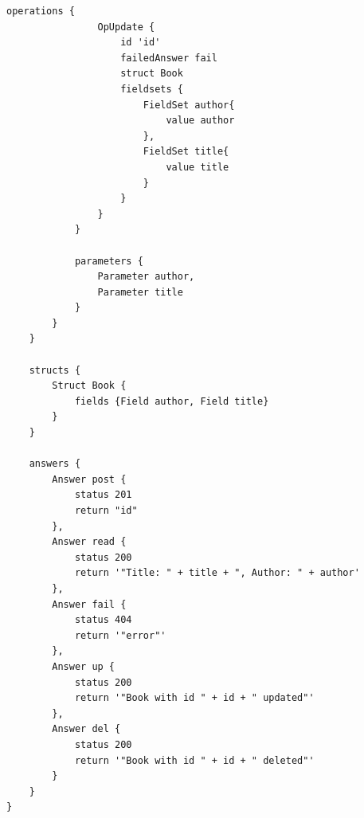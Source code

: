 \documentclass[runningheads]{llncs}
\begin{document}
\begin{center}
\begin{lstlisting}[basicstyle = \scriptsize]
            operations {
                OpUpdate {
                    id 'id'
                    failedAnswer fail
                    struct Book
                    fieldsets {
                        FieldSet author{
                            value author
                        },
                        FieldSet title{
                            value title
                        }
                    }
                }
            }

            parameters {
                Parameter author,
                Parameter title
            }
        }
    }

    structs {
        Struct Book {
            fields {Field author, Field title}
        }
    }

    answers {
        Answer post {
            status 201
            return "id"
        },
        Answer read {
            status 200
            return '"Title: " + title + ", Author: " + author'
        },
        Answer fail {
            status 404
            return '"error"'
        },
        Answer up {
            status 200
            return '"Book with id " + id + " updated"'
        },
        Answer del {
            status 200
            return '"Book with id " + id + " deleted"'
        }
    } 
}
\end{lstlisting}
\end{center}
\end{document}
